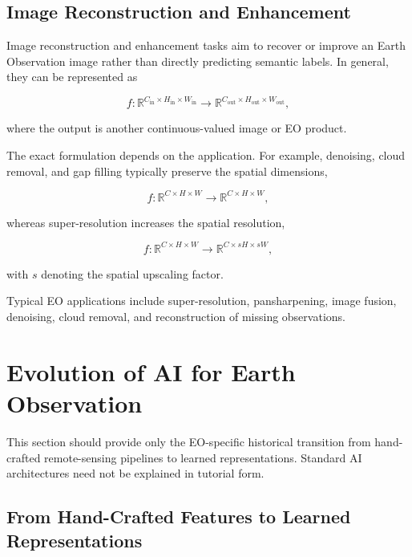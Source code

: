 \documentclass[11pt,a4paper]{article}
\begin{document}
\subsection{Image Reconstruction and Enhancement}

Image reconstruction and enhancement tasks aim to recover or improve an
Earth Observation image rather than directly predicting semantic labels.
In general, they can be represented as

\[
f:
\mathbb{R}^{C_{\mathrm{in}}\times H_{\mathrm{in}}\times W_{\mathrm{in}}}
\rightarrow
\mathbb{R}^{C_{\mathrm{out}}\times H_{\mathrm{out}}\times W_{\mathrm{out}}},
\]

where the output is another continuous-valued image or EO product.

The exact formulation depends on the application. For example, denoising,
cloud removal, and gap filling typically preserve the spatial dimensions,

\[
f:
\mathbb{R}^{C\times H\times W}
\rightarrow
\mathbb{R}^{C\times H\times W},
\]

whereas super-resolution increases the spatial resolution,

\[
f:
\mathbb{R}^{C\times H\times W}
\rightarrow
\mathbb{R}^{C\times sH\times sW},
\]

with \(s\) denoting the spatial upscaling factor.

Typical EO applications include super-resolution, pansharpening, image
fusion, denoising, cloud removal, and reconstruction of missing
observations.


\section{Evolution of AI for Earth Observation}

This section should provide only the EO-specific historical transition
from hand-crafted remote-sensing pipelines to learned representations.
Standard AI architectures need not be explained in tutorial form.

\subsection{From Hand-Crafted Features to Learned Representations}

\end{document}
